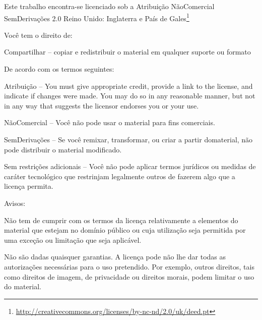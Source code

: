 
\cleartorecto
\thispagestyle{plain}

{\smaller\setlength{\parindent}{0pt}%
\raggedright\label{copyright-details}
\setlength{\parskip}{7pt}
{\centering

{\LARGE\ccbyncnd}

Este trabalho encontra-se licenciado sob a
Atribuição NãoComercial\\ SemDerivações 2.0 Reino Unido: Inglaterra e País de Gales\footnote{%
\href{http://creativecommons.org/licenses/by-nc-nd/2.0/uk/deed.pt}{http://creativecommons.org/licenses/by-nc-nd/2.0/uk/deed.pt}}

}

Você tem o direito de:

\begin{packeditemize}
\item Compartilhar -- copiar e redistribuir o material em qualquer suporte ou formato
\end{packeditemize}

De acordo com os termos seguintes:

\begin{packeditemize}
\item Atribuição -- You must give appropriate credit, provide a link to the license, and indicate if changes were made. You may do so in any reasonable manner, but not in any way that suggests the licensor endorses you or your use.
\item NãoComercial -- Você não pode usar o material para fins comerciais.
\item SemDerivações -- Se você remixar, transformar, ou criar a partir domaterial, não pode distribuir o material modificado.
\end{packeditemize}

Sem restrições adicionais -- Você não pode aplicar termos jurídicos ou medidas de caráter tecnológico que restrinjam legalmente outros de fazerem algo que a licença permita.

Avisos:

\begin{packeditemize}
\item Não tem de cumprir com os termos da licença relativamente a elementos do material que estejam no domínio público ou cuja utilização seja permitida por uma exceção ou limitação que seja aplicável.
\item Não são dadas quaisquer garantias. A licença pode não lhe dar todas as autorizações necessárias para o uso pretendido. Por exemplo, outros direitos, tais como direitos de imagem, de privacidade ou direitos morais, podem limitar o uso do material.
\end{packeditemize}

}
